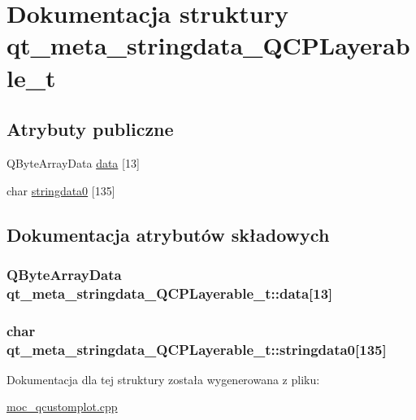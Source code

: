 \hypertarget{structqt__meta__stringdata___q_c_p_layerable__t}{}\section{Dokumentacja struktury qt\+\_\+meta\+\_\+stringdata\+\_\+\+Q\+C\+P\+Layerable\+\_\+t}
\label{structqt__meta__stringdata___q_c_p_layerable__t}
\subsection*{Atrybuty publiczne}
\begin{DoxyCompactItemize}
\item 
Q\+Byte\+Array\+Data \hyperlink{structqt__meta__stringdata___q_c_p_layerable__t_adaa7771b25eb1d5dc6cb97526d7a4995}{data} \mbox{[}13\mbox{]}
\item 
char \hyperlink{structqt__meta__stringdata___q_c_p_layerable__t_a63a3660ec480a3586f023e4d498cee3d}{stringdata0} \mbox{[}135\mbox{]}
\end{DoxyCompactItemize}


\subsection{Dokumentacja atrybutów składowych}
\subsubsection[{\texorpdfstring{data}{data}}]{\setlength{\rightskip}{0pt plus 5cm}Q\+Byte\+Array\+Data qt\+\_\+meta\+\_\+stringdata\+\_\+\+Q\+C\+P\+Layerable\+\_\+t\+::data\mbox{[}13\mbox{]}}\hypertarget{structqt__meta__stringdata___q_c_p_layerable__t_adaa7771b25eb1d5dc6cb97526d7a4995}{}\label{structqt__meta__stringdata___q_c_p_layerable__t_adaa7771b25eb1d5dc6cb97526d7a4995}
\subsubsection[{\texorpdfstring{stringdata0}{stringdata0}}]{\setlength{\rightskip}{0pt plus 5cm}char qt\+\_\+meta\+\_\+stringdata\+\_\+\+Q\+C\+P\+Layerable\+\_\+t\+::stringdata0\mbox{[}135\mbox{]}}\hypertarget{structqt__meta__stringdata___q_c_p_layerable__t_a63a3660ec480a3586f023e4d498cee3d}{}\label{structqt__meta__stringdata___q_c_p_layerable__t_a63a3660ec480a3586f023e4d498cee3d}


Dokumentacja dla tej struktury została wygenerowana z pliku\+:\begin{DoxyCompactItemize}
\item 
\hyperlink{moc__qcustomplot_8cpp}{moc\+\_\+qcustomplot.\+cpp}\end{DoxyCompactItemize}
